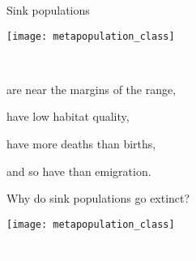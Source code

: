 \documentclass[t]{beamer}
\begin{document}
\begin{frame}[t]{Sink populations}
	\begin{minipage}{0.5\textwidth}
		\begin{center}
			\vspace{1\baselineskip}
			\texttt{[image: metapopulation\_class]}
		\end{center}
	\end{minipage}\begin{minipage}{0.5\textwidth}
		\flushleft
		
		\hangpara \textcolor{white}{A}\vspace{-1\baselineskip}
		
		\hangpara are near the margins of the range,\pause
		
		\hangpara have low habitat quality,\pause
		
		\hangpara have more deaths than births,\pause
		
		\hangpara and so have  than emigration.
		
	\end{minipage}	
\end{frame}
%

\begin{frame}{Why do sink populations go extinct?}
	\begin{minipage}{0.5\textwidth}
		\begin{center}
			\vspace{1\baselineskip}
			\texttt{[image: metapopulation\_class]}
		\end{center}
	\end{minipage}\begin{minipage}{0.5\textwidth}
		\flushleft
		
		\hangpara \textcolor{white}{A}\vspace{-1\baselineskip}
		
		\hangpara \makebox[0.8\textwidth]{\hrulefill}
		
		\hangpara \makebox[0.8\textwidth]{\hrulefill}
		
		\hangpara \makebox[0.8\textwidth]{\hrulefill}
		
		\hangpara \makebox[0.8\textwidth]{\hrulefill}
		
		\hangpara \makebox[0.8\textwidth]{\hrulefill}
		
	\end{minipage}	
\end{frame}
%
\end{document}
